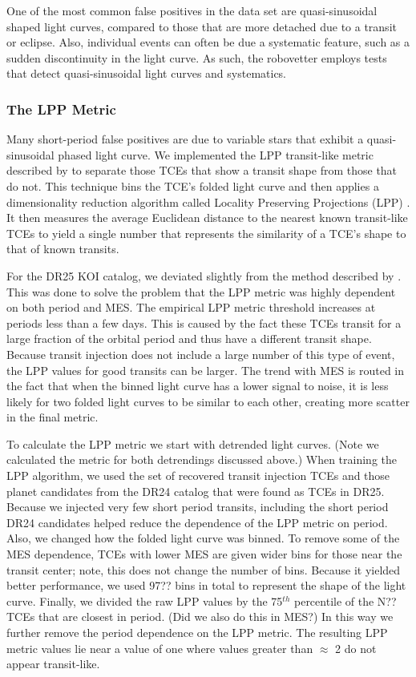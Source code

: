 One of the most common false positives in the data set are quasi-sinusoidal shaped light curves, compared to those that are more detached due to a transit or eclipse. Also, individual events can often be due a systematic feature, such as a sudden discontinuity in the light curve. As such, the robovetter employs tests that detect quasi-sinusoidal light curves and systematics.


\subsubsection{The LPP Metric}
\label{s:lpp}

Many short-period false positives are due to variable stars that exhibit a quasi-sinusoidal phased light curve. We implemented the LPP transit-like metric described by \citet{Thompson2015b} to separate those TCEs that show a transit shape from those that do not. This technique bins the TCE's folded light curve and then applies a dimensionality reduction algorithm called Locality Preserving Projections (LPP) \citep{}.  It then measures the average Euclidean distance to the nearest known transit-like TCEs to yield a single number that represents the similarity of a TCE's shape to that of known transits. 

For the DR25 KOI catalog, we deviated slightly from the method described by \citet{Thompson2015b}.  This was done to solve the problem that the LPP metric was highly dependent on both period and MES. The empirical LPP metric threshold increases at periods less than a few days. This is caused by the fact these TCEs transit for a large fraction of the orbital period and thus have a different transit shape. Because transit injection does not include a large number of this type of event, the LPP values for good transits can be larger.  The trend with MES is routed in the fact that when the binned light curve has a lower signal to noise, it is less likely for two folded light curves to be similar to each other, creating more scatter in the final metric. 

To calculate the LPP metric we start with detrended \kepler{} light curves. (Note we calculated the metric for both detrendings discussed above.)  When training the LPP algorithm, we used the set of recovered transit injection TCEs and those planet candidates from the DR24 catalog \citep{Coughlin2016cat} that were found as TCEs in DR25.  Because we injected very few short period transits, including the short period DR24 candidates helped reduce the dependence of the LPP metric on period.  Also, we changed how the folded light curve was binned. To remove some of the MES dependence, TCEs with lower MES are given wider bins for those near the transit center; note, this does not change the number of bins. Because it yielded better performance, we used 97?? bins in total to represent the shape of the light curve.  Finally, we divided the raw LPP values by the 75$^{th}$ percentile of the N?? TCEs that are closest in period. (Did we also do this in MES?) In this way we further remove the period dependence on the LPP metric.  The resulting LPP metric values lie near a value of one where values greater than $\approx$ 2 do not appear transit-like.  

